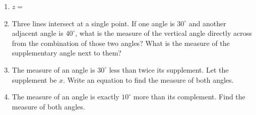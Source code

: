 \documentclass[12pt, letterpaper, fleqn]{article}
\newcommand{\blank}{\underline{\hspace{2.2cm}}}
\begin{document}
\vspace{3mm}

\begin{enumerate}[itemsep=5.5cm, leftmargin=0.6cm, resume]
\item $z = $ \blank
\item Three lines intersect at a single point. If one angle is $30^\circ$ and another adjacent angle is $40^\circ$, what is the measure of the vertical angle directly across from the combination of those two angles? What is the measure of the supplementary angle next to them?
\item The measure of an angle is $30^\circ$ less than twice its supplement. Let the supplement be $x$. Write an equation to find the measure of both angles.
\item The measure of an angle is exactly $10^\circ$ more than its complement. Find the measure of both angles.
\end{enumerate}
\end{document}
